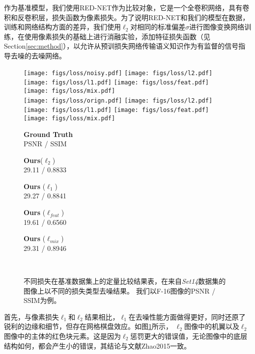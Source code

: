 作为基准模型，我们使用RED-NET\cite{Mao2016}作为比较对象，它是一个全卷积网络，具有卷积和反卷积层，损失函数为像素损失。为了说明RED-NET和我们的模型在数据，训练和网络结构方面的差异，我们使用$ \ell_{2} $对相同的标准偏差$ \sigma $进行图像变换网络训练，在使用像素损失的基础上进行消融实验，添加特征损失函数（见Section\ref{sec:method}），以允许从预训损失网络传输语义知识作为有监督的信号指导去噪的去噪网络。

\begin{figure}[t]
\centering
  \texttt{[image: figs/loss/noisy.pdf]}
  \texttt{[image: figs/loss/l2.pdf]}
  \texttt{[image: figs/loss/l1.pdf]}
  \texttt{[image: figs/loss/feat.pdf]}
  \texttt{[image: figs/loss/mix.pdf]}  \\{}
  \texttt{[image: figs/loss/orign.pdf]}
  \texttt{[image: figs/loss/l2.pdf]}
  \texttt{[image: figs/loss/l1.pdf]}
  \texttt{[image: figs/loss/feat.pdf]}
  \texttt{[image: figs/loss/mix.pdf]} \\
   \begin{minipage}{0.17\textwidth}
        \centering \textbf{Ground Truth} \\ PSNR / SSIM
   \end{minipage}
   \begin{minipage}{0.17\textwidth}
     \centering \textbf{Ours}($\ell_{2}$) \\ 29.11 / 0.8833
   \end{minipage}
   \begin{minipage}{0.17\textwidth}
     \centering \textbf{Ours} ($\ell_{1}$) \\ 29.27 / 0.8841
   \end{minipage}
   \begin{minipage}{0.17\textwidth}
     \centering \textbf{Ours} ($\ell_{feat}$) \\  19.61 / 0.6560
   \end{minipage}
   \begin{minipage}{0.17\textwidth}
     \centering \textbf{Ours} ($\ell_{mix}$) \\  29.31 / 0.8946
   \end{minipage} \\
  \caption[不同损失在基准数据集上的定量比较结果表]{不同损失在基准数据集上的定量比较结果表，在来自{\it Set14}数据集的图像上以不同的损失类型去噪结果。 我们以F-16图像的PSNR / SSIM为例。 
  }
  \vspace{-4mm}
  \label{fig:l1-l2-feat-results}
\end{figure}
首先，与像素损失$ \ell_{1} $和$ \ell_{2} $结果相比，$ \ell_{1} $在去噪性能方面做得更好，同时还原了锐利的边缘和细节，但存在网格棋盘效应。如图\ref{fig:l1-l2-feat-results}所示，
$ \ell_{2} $图像中的机翼以及$ \ell_{2} $图像中的主体的红色块元素。这是因为$ \ell_{2} $惩罚更大的错误值，无论图像中的底层结构如何，都会产生小的错误，其结论与文献{Zhao2015}一致。

